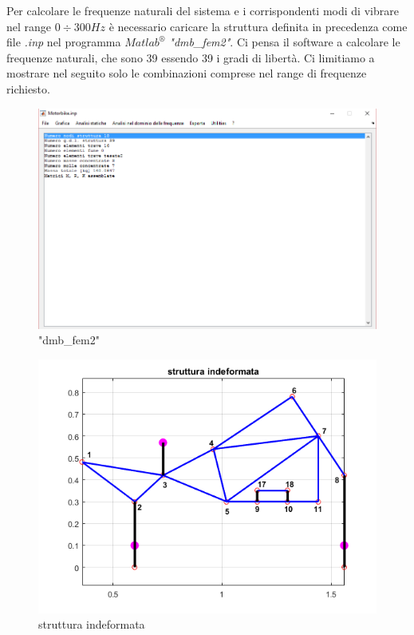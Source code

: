 \documentclass[12pt, a4paper]{article}
\begin{document}
	Per calcolare le frequenze naturali del sistema e i corrispondenti modi di vibrare nel range $0\div300Hz$ è necessario caricare la struttura definita in precedenza come file \textit{.inp} nel programma \textit{$Matlab^{\circledR}$ "dmb\_fem2"}. Ci pensa il software a calcolare le frequenze naturali, che sono 39 essendo 39 i gradi di libertà. Ci limitiamo a mostrare nel seguito solo le combinazioni comprese nel range di frequenze richiesto.    
	\begin{figure}[h]
		\centering
		\includegraphics[scale=0.5]{GdL}
		\caption{"dmb\_fem2"}
	\end{figure}
	\begin{figure}[h]
		\centering
		\includegraphics[scale=0.6]{struttura_indeformata}
		\caption{struttura indeformata}
	\end{figure}
\end{document}
